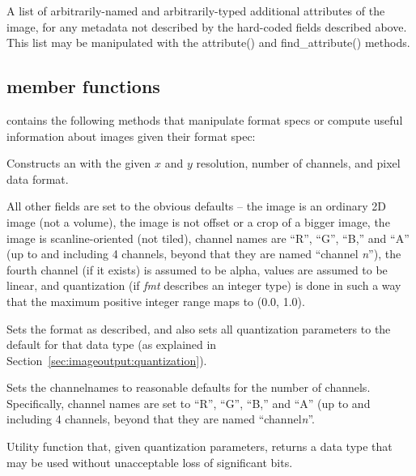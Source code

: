 A list of arbitrarily-named and arbitrarily-typed additional attributes
of the image, for any metadata not described by the hard-coded fields
described above.  This list may be manipulated with the {\cf
attribute()} and {\cf find_attribute()} methods.
\apiend

\subsection{\ImageSpec member functions}
\label{sec:ImageSpecMemberFuncs}

\noindent \ImageSpec contains the following methods that
manipulate format specs or compute useful information about images given
their format spec:

Constructs an \ImageSpec with the given $x$ and $y$ resolution, number
of channels, and pixel data format.

All other fields are set to the obvious defaults -- the image is an
ordinary 2D image (not a volume), the image is not offset or a crop of a
bigger image, the image is scanline-oriented (not tiled), channel names
are ``R'', ``G'', ``B,'' and ``A'' (up to and including 4 channels,
beyond that they are named ``channel \emph{n}''), the fourth channel (if
it exists) is assumed to be alpha, values are assumed to be linear, and
quantization (if \emph{fmt} describes an integer type) is done in
such a way that the maximum positive integer range maps to (0.0, 1.0).
\apiend

Sets the format as described, and also sets all quantization parameters
to the default for that data type (as explained in 
Section~\ref{sec:imageoutput:quantization}).
\apiend

Sets the {\cf channelnames} to reasonable defaults for the number of
channels.  Specifically, channel names are set to ``R'', ``G'', ``B,''
and ``A'' (up to and including 4 channels, beyond that they are named
``channel\emph{n}''.
\apiend

Utility function that, given quantization parameters, returns a data
type that may be used without unacceptable loss of significant bits.
\apiend

